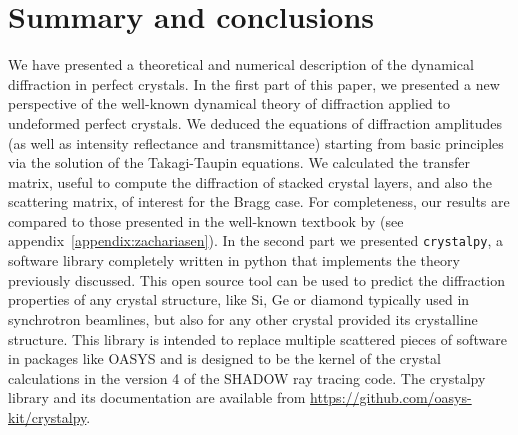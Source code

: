 \documentclass[preprint]{iucr}              %
\newcommand{\todo}[1]{{\color{red}[TODO: "#1'']}}
\begin{document}


%
\section{Summary and conclusions}
\label{sec:summary}

We have presented a theoretical and numerical description of the dynamical diffraction in perfect crystals. In the first part of this paper, we presented a new perspective of the well-known dynamical theory of diffraction applied to undeformed perfect crystals. We deduced the equations of diffraction amplitudes (as well as intensity reflectance and transmittance) starting from basic principles via the solution of the Takagi-Taupin equations. We calculated the transfer matrix, useful to compute the diffraction of stacked crystal layers, and also the scattering matrix, of interest for the Bragg case. For completeness, our results are compared to those presented in the well-known textbook by \cite{ZachariasenBook} (see appendix~\ref{appendix:zachariasen}).
In the second part we presented {\tt crystalpy}, a software library completely written in python that implements the theory previously discussed. This open source tool can be used to predict the diffraction properties of any crystal structure, like Si, Ge or diamond typically used in synchrotron beamlines, but also for any other crystal provided its crystalline structure. This library is intended to replace multiple scattered pieces of software in packages like OASYS \cite{codeOASYS} and is designed to be the kernel of the crystal calculations in the version 4 of the SHADOW \cite{codeSHADOW} ray tracing code. The crystalpy library and its documentation are available from \url{https://github.com/oasys-kit/crystalpy}. 
\end{document}

